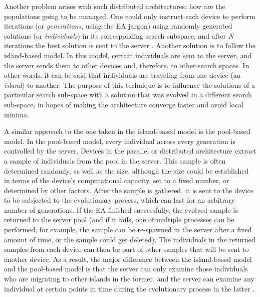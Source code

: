 
Another problem arises with such distributed architectures: how are the populations going to be managed. One could only instruct each device to perform iterations (or \textit{generations}, using the EA jargon) using randomly generated solutions (or \textit{individuals}) in its corresponding search subspace, and after \textit{N} iterations the best solution is sent to the server \cite{sahin2007distributed}. Another solution is to follow the island-based model. %
In this model, certain individuals are sent to the server,
and the server sends them to other devices and, therefore, to other search spaces. In other words, it can be said that individuals are traveling from one device (an \textit{island}) to another. The purpose of this technique is to influence the solutions of a particular search sub-space with a solution that was evolved in a different search sub-space, in hopes of making the architecture converge faster and avoid local minima.

A similar approach to the one taken in the island-based model is the pool-based %
model. In the pool-based model, every individual across every generation is controlled by the server. Devices in the parallel or distributed architecture extract a sample of individuals from the pool in the server. This sample is often determined randomly, as well as the size, although the size could be established in terms of the device's computational capacity, set to a fixed number, or determined by other factors. After the sample is gathered, it is sent to the device to be subjected to the evolutionary process, which can last for an arbitrary number of generations. If the EA finished successfully, the evolved sample is returned to the server pool (and if it fails, one of multiple processes can be performed, for example, the sample can be re-spawned in the server after a fixed amount of time, or the sample could get deleted). The individuals in the returned samples from each device can then be part of other samples that will be sent to another device. As a result, the major difference between the island-based model and the pool-based model is that the server can only examine those individuals who are migrating to other islands in the former, and the server can examine any individual at certain points in time during the evolutionary process in the latter \cite{garcia2014randomized}.

